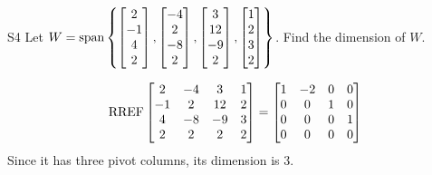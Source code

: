 \begin{problem}{S4}
Let \(
  W=\operatorname{span}\left\{
    \begin{bmatrix} 2 \\ -1 \\ 4 \\2 \end{bmatrix},
    \begin{bmatrix} -4 \\ 2 \\ -8 \\2 \end{bmatrix},
    \begin{bmatrix} 3 \\ 12 \\ -9 \\2 \end{bmatrix},
    \begin{bmatrix} 1 \\ 2 \\ 3 \\2 \end{bmatrix}
  \right\}
\). Find the dimension of \(W\).
\end{problem}
\begin{solution}
\[
  \operatorname{RREF}\begin{bmatrix}
    2 & -4 & 3 & 1  \\
    -1 & 2 & 12 & 2  \\
    4 & -8 & -9 & 3 \\
    2 & 2 & 2 & 2
  \end{bmatrix} =
  \begin{bmatrix}
    1 & -2 & 0 & 0 \\
    0 & 0 & 1 & 0 \\
    0 & 0 & 0 & 1 \\
    0 & 0 & 0 & 0
  \end{bmatrix}
\]
Since it has three pivot columns, its dimension is \(3\).
\end{solution}
